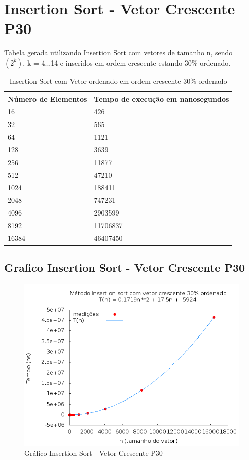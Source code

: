 \documentclass[12pt,a4paper,twoside]{report}
\begin{document}
\section{Insertion Sort - Vetor Crescente P30}
Tabela gerada utilizando Insertion Sort com vetores de tamanho n, sendo = $(2^k)$, k = 4...14 e inseridos em ordem crescente estando 30\% ordenado.

\begin{table}[H]
\centering
\caption{Insertion Sort com Vetor ordenado em ordem crescente 30\% ordenado}
\label{my-label}
\begin{tabular}{|l|l|}
\hline
\multicolumn{1}{|c|}{\textbf{Número de Elementos}} & \multicolumn{1}{c|}{\textbf{Tempo de execução em nanosegundos}} \\ \hline
16 & 426 \\ \hline
32 & 565 \\ \hline
64 & 1121 \\ \hline
128 & 3639 \\ \hline
256 & 11877 \\ \hline
512 & 47210 \\ \hline
1024 & 188411 \\ \hline
2048 & 747231 \\ \hline
4096 & 2903599 \\ \hline
8192 & 11706837 \\ \hline
16384 & 46407450 \\ \hline
\end{tabular}
\end{table}

\subsection{Grafico Insertion Sort - Vetor Crescente P30}
\begin{figure}[H]
    \centering
    \includegraphics[width=0.7\linewidth]{graficos/Insertion/vIntCrescenteP30/vIntCrescenteP30.png}
  \caption{Gráfico Insertion Sort - Vetor Crescente P30}
\end{figure}
\end{document}
